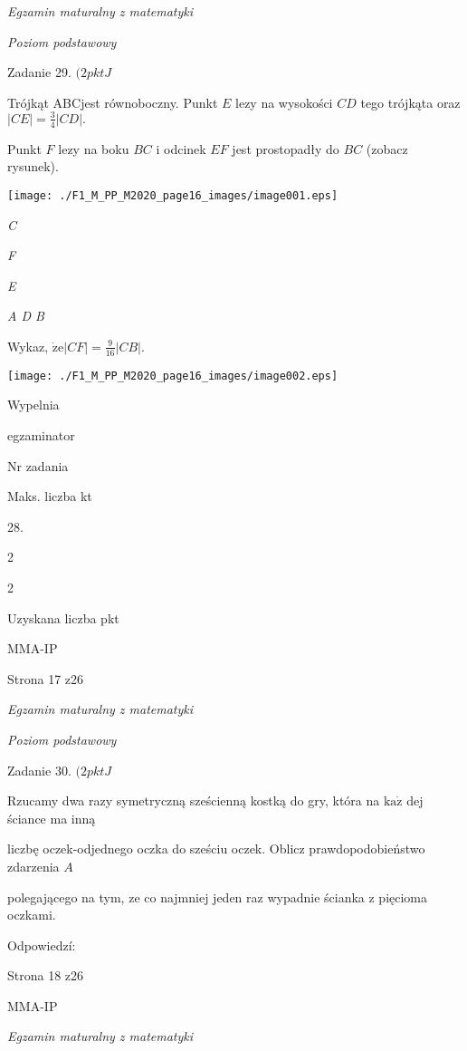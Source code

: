 \documentclass[a4paper,12pt]{article}
\begin{document}
{\it Egzamin maturalny z matematyki}

{\it Poziom podstawowy}

Zadanie 29. $(2pktJ$

Trójkąt ABCjest równoboczny. Punkt $E$ lezy na wysokości $CD$ tego trójkąta oraz $|CE|=\displaystyle \frac{3}{4}|CD|.$

Punkt $F$ lezy na boku $BC$ i odcinek $EF$ jest prostopadły do $BC$ (zobacz rysunek).
\begin{center}
\texttt{[image: ./F1\_M\_PP\_M2020\_page16\_images/image001.eps]}
\end{center}
{\it C}

{\it F}

{\it E}

{\it A  D  B}

Wykaz, $\displaystyle \dot{\mathrm{z}}\mathrm{e}|CF|=\frac{9}{16}|CB|.$
\begin{center}
\texttt{[image: ./F1\_M\_PP\_M2020\_page16\_images/image002.eps]}
\end{center}
Wypelnia

egzaminator

Nr zadania

Maks. liczba kt

28.

2

2

Uzyskana liczba pkt

MMA-IP

Strona 17 z26





{\it Egzamin maturalny z matematyki}

{\it Poziom podstawowy}

Zadanie 30. $(2pktJ$

Rzucamy dwa razy symetryczną sześcienną kostką do gry, która na $\mathrm{k}\mathrm{a}\dot{\mathrm{z}}$ dej ściance ma inną

liczbę oczek-odjednego oczka do sześciu oczek. Oblicz prawdopodobieństwo zdarzenia $A$

polegającego na tym, ze co najmniej jeden raz wypadnie ścianka z pięcioma oczkami.

Odpowiedzí:

Strona 18 z26

MMA-IP





{\it Egzamin maturalny z matematyki}
\end{document}
